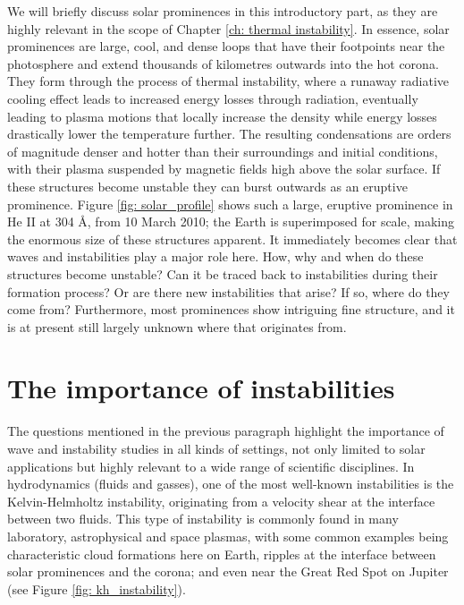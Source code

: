 We will briefly discuss solar prominences in this introductory part, as they are highly relevant in the scope of Chapter \ref{ch: thermal instability}. In essence, solar prominences are large, cool, and dense loops that have their footpoints near the photosphere and extend thousands of kilometres outwards into the hot corona.
They form through the process of thermal instability, where a runaway radiative cooling effect leads to increased energy losses through radiation, eventually leading to plasma motions that locally increase the density while energy losses drastically lower the temperature further. The resulting condensations are orders of magnitude denser and hotter than their surroundings and initial conditions, with their plasma suspended by magnetic fields high above the solar surface. If these structures become unstable they can burst outwards as an eruptive prominence. Figure \ref{fig: solar_profile} shows such a large, eruptive prominence in He II at 304 \AA, from 10 March 2010; the Earth is superimposed for scale, making the enormous size of these structures apparent. It immediately becomes clear that waves and instabilities play a major role here. How, why and when do these structures become unstable? Can it be traced back to instabilities during their formation process? Or are there new instabilities that arise? If so, where do they come from? Furthermore, most prominences show intriguing fine structure, and it is at present still largely unknown where that originates from.

\section{The importance of instabilities}
The questions mentioned in the previous paragraph highlight the importance of wave and instability studies in all kinds of settings, not only limited to solar applications but highly relevant to a wide range of scientific disciplines. In hydrodynamics (fluids and gasses), one of the most well-known instabilities is the Kelvin-Helmholtz instability, originating from a velocity shear at the interface between two fluids. This type of instability is commonly found in many laboratory, astrophysical and space plasmas, with some common examples being characteristic cloud formations here on Earth, ripples at the interface between solar prominences and the corona; and even near the Great Red Spot on Jupiter (see Figure \ref{fig: kh_instability}).

